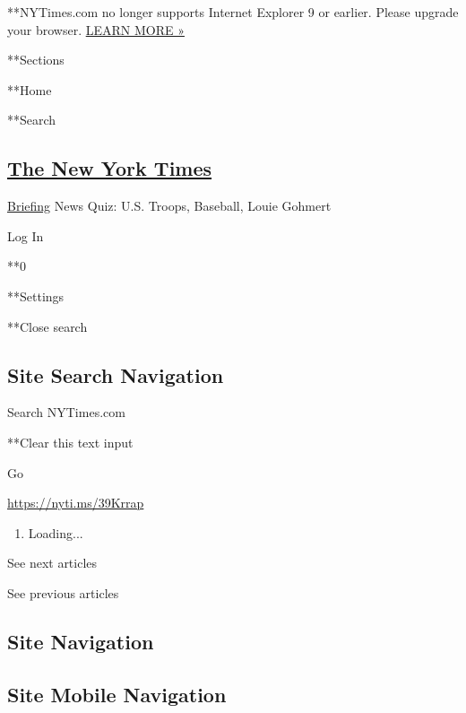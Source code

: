  **NYTimes.com no longer supports Internet Explorer 9 or earlier. Please
upgrade your browser.
\href{http://www.nytimes3xbfgragh.onion/content/help/site/ie9-support.html}{LEARN
MORE »}

**Sections

**Home

**Search

\hypertarget{the-new-york-times}{%
\subsection{\texorpdfstring{\href{http://www.nytimes3xbfgragh.onion/}{The
New York Times}}{The New York Times}}\label{the-new-york-times}}


\href{/interactive/2018/briefing/global-morning-briefing-newsletter-signup.html}{Briefing}
\textbar{}News Quiz: U.S. Troops, Baseball, Louie Gohmert

Log In

**0

**Settings

**Close search

\hypertarget{site-search-navigation}{%
\subsection{Site Search Navigation}\label{site-search-navigation}}

Search NYTimes.com

**Clear this text input

Go

\url{https://nyti.ms/39Krrap}

\begin{enumerate}
\def\labelenumi{\arabic{enumi}.}
\item
  Loading...
\end{enumerate}

See next articles

See previous articles

\hypertarget{site-navigation}{%
\subsection{Site Navigation}\label{site-navigation}}

\hypertarget{site-mobile-navigation}{%
\subsection{Site Mobile Navigation}\label{site-mobile-navigation}}

